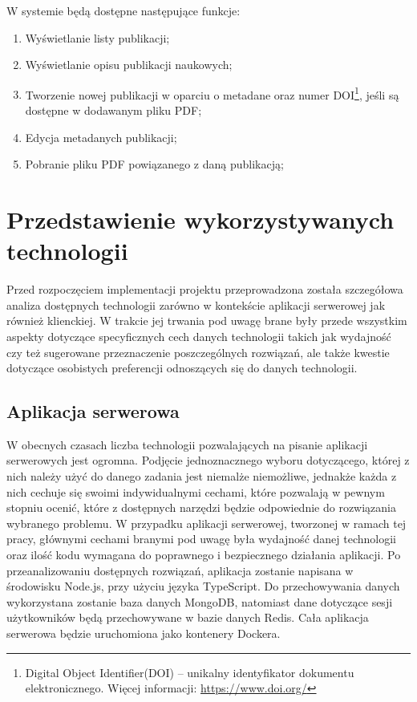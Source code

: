 \documentclass[a4paper,12pt,twoside,openany]{report}
\begin{document}
W systemie będą dostępne następujące funkcje:		
\begin{enumerate}
	\item Wyświetlanie listy publikacji;
	\item Wyświetlanie opisu publikacji naukowych;
	\item Tworzenie nowej publikacji w oparciu o metadane oraz numer DOI\footnote{Digital Object Identifier(DOI) -- unikalny identyfikator dokumentu elektronicznego. Więcej informacji: \url{https://www.doi.org/} }, jeśli są dostępne w dodawanym pliku PDF;
	\item Edycja metadanych publikacji;
	\item Pobranie pliku PDF powiązanego z daną publikacją;
\end{enumerate}
\chapter{Przedstawienie wykorzystywanych technologii}
Przed rozpoczęciem implementacji projektu przeprowadzona została szczegółowa analiza dostępnych technologii zarówno w kontekście aplikacji serwerowej jak również klienckiej. W trakcie jej trwania pod uwagę brane były przede wszystkim aspekty dotyczące specyficznych cech danych technologii takich jak wydajność czy też sugerowane przeznaczenie poszczególnych rozwiązań, ale także kwestie dotyczące osobistych preferencji odnoszących się do danych technologii. \cite{LOKI2}
\section{Aplikacja serwerowa}
W obecnych czasach liczba technologii pozwalających na pisanie aplikacji serwerowych jest ogromna. Podjęcie jednoznacznego wyboru dotyczącego, której z nich należy użyć do danego zadania jest niemalże niemożliwe, jednakże każda z nich cechuje się swoimi indywidualnymi cechami, które pozwalają w pewnym stopniu ocenić, które z dostępnych narzędzi będzie odpowiednie do rozwiązania wybranego problemu. W przypadku aplikacji serwerowej, tworzonej w ramach tej pracy, głównymi cechami branymi pod uwagę była wydajność danej technologii oraz ilość kodu wymagana do poprawnego i bezpiecznego działania aplikacji. Po przeanalizowaniu dostępnych rozwiązań, aplikacja zostanie napisana w środowisku Node.js, przy użyciu języka TypeScript. Do przechowywania danych wykorzystana zostanie baza danych MongoDB, natomiast dane dotyczące sesji użytkowników będą przechowywane w bazie danych Redis. Cała aplikacja serwerowa będzie uruchomiona jako kontenery Dockera.
\end{document}

